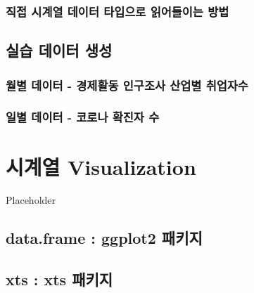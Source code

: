 \documentclass[
]{book}
\begin{document}
\hypertarget{uxc9c1uxc811-uxc2dcuxacc4uxc5f4-uxb370uxc774uxd130-uxd0c0uxc785uxc73cuxb85c-uxc77duxc5b4uxb4e4uxc774uxb294-uxbc29uxbc95}{%
\subsection{직접 시계열 데이터 타입으로 읽어들이는 방법}\label{uxc9c1uxc811-uxc2dcuxacc4uxc5f4-uxb370uxc774uxd130-uxd0c0uxc785uxc73cuxb85c-uxc77duxc5b4uxb4e4uxc774uxb294-uxbc29uxbc95}}

\hypertarget{uxc2e4uxc2b5-uxb370uxc774uxd130-uxc0dduxc131}{%
\section{실습 데이터 생성}\label{uxc2e4uxc2b5-uxb370uxc774uxd130-uxc0dduxc131}}

\hypertarget{uxc6d4uxbcc4-uxb370uxc774uxd130---uxacbduxc81cuxd65cuxb3d9-uxc778uxad6cuxc870uxc0ac-uxc0b0uxc5c5uxbcc4-uxcde8uxc5c5uxc790uxc218}{%
\subsection{월별 데이터 - 경제활동 인구조사 산업별 취업자수}\label{uxc6d4uxbcc4-uxb370uxc774uxd130---uxacbduxc81cuxd65cuxb3d9-uxc778uxad6cuxc870uxc0ac-uxc0b0uxc5c5uxbcc4-uxcde8uxc5c5uxc790uxc218}}

\hypertarget{uxc77cuxbcc4-uxb370uxc774uxd130---uxcf54uxb85cuxb098-uxd655uxc9c4uxc790-uxc218}{%
\subsection{일별 데이터 - 코로나 확진자 수}\label{uxc77cuxbcc4-uxb370uxc774uxd130---uxcf54uxb85cuxb098-uxd655uxc9c4uxc790-uxc218}}

\hypertarget{uxc2dcuxacc4uxc5f4-visualization}{%
\chapter{시계열 Visualization}\label{uxc2dcuxacc4uxc5f4-visualization}}

Placeholder

\hypertarget{data.frame-ggplot2-uxd328uxd0a4uxc9c0}{%
\section{data.frame : ggplot2 패키지}\label{data.frame-ggplot2-uxd328uxd0a4uxc9c0}}

\hypertarget{xts-xts-uxd328uxd0a4uxc9c0}{%
\section{xts : xts 패키지}\label{xts-xts-uxd328uxd0a4uxc9c0}}
\end{document}
